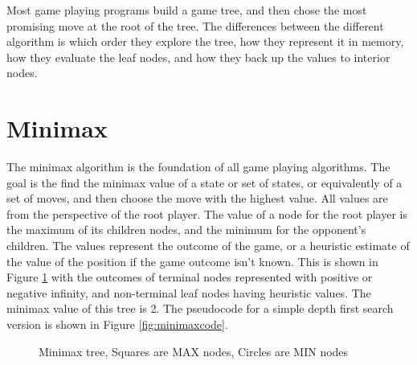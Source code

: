 

Most game playing programs build a game tree, and then chose the most promising move at the root of the tree. The differences between the different algorithm is which order they explore the tree, how they represent it in memory, how they evaluate the leaf nodes, and how they back up the values to interior nodes.

\section{Minimax}

The minimax algorithm is the foundation of all game playing algorithms. The goal is the find the minimax value of a state or set of states, or equivalently of a set of moves, and then choose the move with the highest value. All values are from the perspective of the root player. The value of a node for the root player is the maximum of its children nodes, and the minimum for the opponent's children. The values represent the outcome of the game, or a heuristic estimate of the value of the position if the game outcome isn't known. This is shown in Figure \ref{fig:minimaxtree} with the outcomes of terminal nodes represented with positive or negative infinity, and non-terminal leaf nodes having heuristic values. The minimax value of this tree is 2. The pseudocode for a simple depth first search version is shown in Figure \ref{fig:minimaxcode}.

\begin{figure}
\centering
{}
\caption{Minimax tree, Squares are MAX nodes, Circles are MIN nodes}
\label{fig:minimaxtree}
\end{figure}


